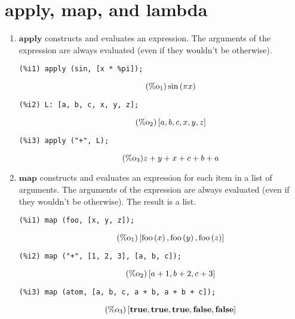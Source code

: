 \documentclass[12pt,leqno]{article}
\begin{document}
\section{apply, map, and lambda}

\begin{enumerate}

\item $\mathbf{apply}$ constructs and evaluates an expression.
The arguments of the expression are always evaluated (even if they wouldn't be otherwise).
\begin{verbatim}
(%i1) apply (sin, [x * %pi]);
\end{verbatim}
\begin{equation}
\tag{$\mathop{\mathrm{\%o}}_{1}$}\sin \left(\pi x\right)
\label{eq:doc-group1-code23-1-1}
\end{equation}
\begin{verbatim}
(%i2) L: [a, b, c, x, y, z];
\end{verbatim}
\begin{equation}
\tag{$\mathop{\mathrm{\%o}}_{2}$}\left[a, b, c, x, y, z\right]
\label{eq:doc-group1-code23-2-1}
\end{equation}
\begin{verbatim}
(%i3) apply ("+", L);
\end{verbatim}
\begin{equation}
\tag{$\mathop{\mathrm{\%o}}_{3}$}z+y+x+c+b+a
\label{eq:doc-group1-code23-3-1}
\end{equation}


\item $\mathbf{map}$ constructs and evaluates an expression for each item in a list of arguments.
The arguments of the expression are always evaluated (even if they wouldn't be otherwise).
The result is a list.
\begin{verbatim}
(%i1) map (foo, [x, y, z]);
\end{verbatim}
\begin{equation}
\tag{$\mathop{\mathrm{\%o}}_{1}$}\left[\mathop{\mathrm{foo}}\left(x\right), \mathop{\mathrm{foo}}\left(y\right), \mathop{\mathrm{foo}}\left(z\right)\right]
\label{eq:doc-group1-code24-1-1}
\end{equation}
\begin{verbatim}
(%i2) map ("+", [1, 2, 3], [a, b, c]);
\end{verbatim}
\begin{equation}
\tag{$\mathop{\mathrm{\%o}}_{2}$}\left[a+1, b+2, c+3\right]
\label{eq:doc-group1-code24-2-1}
\end{equation}
\begin{verbatim}
(%i3) map (atom, [a, b, c, a + b, a + b + c]);
\end{verbatim}
\begin{equation}
\tag{$\mathop{\mathrm{\%o}}_{3}$}\left[\mathop{\mathbf{true}}, \mathop{\mathbf{true}}, \mathop{\mathbf{true}}, \mathop{\mathbf{false}}, \mathop{\mathbf{false}}\right]
\label{eq:doc-group1-code24-3-1}
\end{equation}



\end{enumerate}
\end{document}
